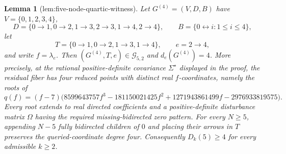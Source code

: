 \documentclass{article}
\newtheorem{lemma}{Lemma}
\begin{document}
\begin{lemma}[lem:five-node-quartic-witness]\label{lem:five-node-quartic-witness}
Let \(G^{(4)}=(V,D,B)\) have \(V=\{0,1,2,3,4\}\),
\[
 D=\{0\to1,0\to2,1\to3,2\to3,1\to4,2\to4\},
 \qquad
 B=\{0\leftrightarrow i:1\leq i\leq4\},
\]
let
\[
 T=\{0\to1,0\to2,1\to3,1\to4\},
 \qquad e=2\to4,
\]
and write \(f=\lambda_e\). Then \((G^{(4)},T,e)\in\mathcal G_{5,2}\) and \(d_e(G^{(4)})=4\). More precisely, at the rational positive-definite covariance \(\Sigma^{\star}\) displayed in the proof, the residual fiber has four reduced points with distinct real \(f\)-coordinates, namely the roots of
\[
 q(f)=(f-7)\bigl(8599643757f^3-181150021425f^2
 +1271943861499f-2976933819575\bigr).
\]
Every root extends to real directed coefficients and a positive-definite disturbance matrix \(\Omega\) having the required missing-bidirected zero pattern. For every \(N\geq5\), appending \(N-5\) fully bidirected children of \(0\) and placing their arrows in \(T\) preserves the queried-coordinate degree four. Consequently \(D_k(5)\geq4\) for every admissible \(k\geq2\).
\end{lemma}
\end{document}
